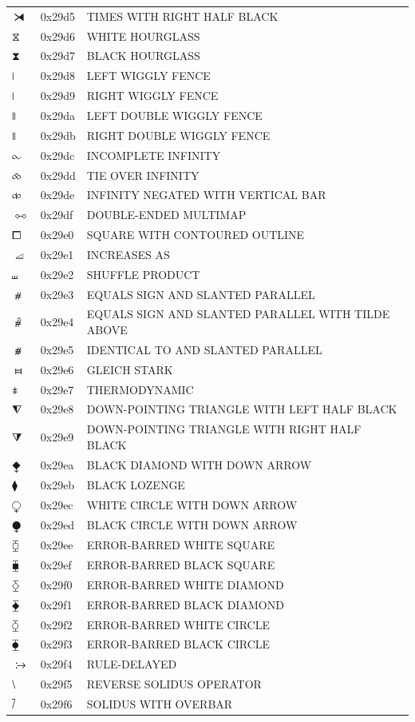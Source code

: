 \documentclass[12pt, twoside]{article}
\begin{document}
\begin{longtable}{L{1.0cm} L{2.0cm} >{\footnotesize}L{10cm}}
$⧕$&0x29d5&TIMES WITH RIGHT HALF BLACK\\
$⧖$&0x29d6&WHITE HOURGLASS\\
$⧗$&0x29d7&BLACK HOURGLASS\\
$⧘$&0x29d8&LEFT WIGGLY FENCE\\
$⧙$&0x29d9&RIGHT WIGGLY FENCE\\
$⧚$&0x29da&LEFT DOUBLE WIGGLY FENCE\\
$⧛$&0x29db&RIGHT DOUBLE WIGGLY FENCE\\
$⧜$&0x29dc&INCOMPLETE INFINITY\\
$⧝$&0x29dd&TIE OVER INFINITY\\
$⧞$&0x29de&INFINITY NEGATED WITH VERTICAL BAR\\
$⧟$&0x29df&DOUBLE-ENDED MULTIMAP\\
$⧠$&0x29e0&SQUARE WITH CONTOURED OUTLINE\\
$⧡$&0x29e1&INCREASES AS\\
$⧢$&0x29e2&SHUFFLE PRODUCT\\
$⧣$&0x29e3&EQUALS SIGN AND SLANTED PARALLEL\\
$⧤$&0x29e4&EQUALS SIGN AND SLANTED PARALLEL WITH TILDE ABOVE\\
$⧥$&0x29e5&IDENTICAL TO AND SLANTED PARALLEL\\
$⧦$&0x29e6&GLEICH STARK\\
$⧧$&0x29e7&THERMODYNAMIC\\
$⧨$&0x29e8&DOWN-POINTING TRIANGLE WITH LEFT HALF BLACK\\
$⧩$&0x29e9&DOWN-POINTING TRIANGLE WITH RIGHT HALF BLACK\\
$⧪$&0x29ea&BLACK DIAMOND WITH DOWN ARROW\\
$⧫$&0x29eb&BLACK LOZENGE\\
$⧬$&0x29ec&WHITE CIRCLE WITH DOWN ARROW\\
$⧭$&0x29ed&BLACK CIRCLE WITH DOWN ARROW\\
$⧮$&0x29ee&ERROR-BARRED WHITE SQUARE\\
$⧯$&0x29ef&ERROR-BARRED BLACK SQUARE\\
$⧰$&0x29f0&ERROR-BARRED WHITE DIAMOND\\
$⧱$&0x29f1&ERROR-BARRED BLACK DIAMOND\\
$⧲$&0x29f2&ERROR-BARRED WHITE CIRCLE\\
$⧳$&0x29f3&ERROR-BARRED BLACK CIRCLE\\
$⧴$&0x29f4&RULE-DELAYED\\
$⧵$&0x29f5&REVERSE SOLIDUS OPERATOR\\
$⧶$&0x29f6&SOLIDUS WITH OVERBAR\\

\end{longtable}
\end{document}
